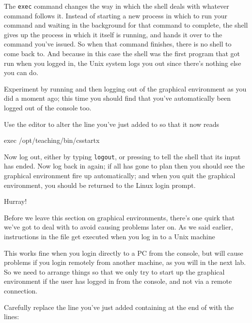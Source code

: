 The \texttt{exec} command changes the way in which the shell deals with whatever command follows it. Instead of starting a new process in which to run your command and waiting in the background for that command to complete, the shell gives up the process in which it itself is running, and hands it over to the command you've issued. So when that command finishes, there is no shell to come back to. And because in this case the shell was the first program that got run when you logged in, the Unix system logs you out since there's nothing else you can do.

Experiment by running  and then logging out of the graphical environment as you did a moment ago; this time you should find that you've automatically been logged out of the console too.

Use the  editor to alter the line you've just added to  so that it now reads

\begin{ttoutenv}
exec /opt/teaching/bin/csstartx
\end{ttoutenv}

Now log out, either by typing \texttt{logout},  or  pressing  to tell the shell that its input has ended. Now log back in again; if all has gone to plan then you should see the graphical environment fire up automatically; and when you quit the graphical environment, you should be returned to the Linux login prompt.

Hurray!

Before we leave this section on graphical environments, there's one quirk that we've got to deal with to avoid causing problems later on. As we said earlier, instructions in the  file get executed when you log in to a Unix machine

This works fine when you login directly to a PC from the console, but will cause problems if you login remotely from another machine, as you will in the next lab. So we need to arrange things so that we only try to start up the graphical environment if the user has logged in from the console, and not via a remote connection.

Carefully replace the line you've just added containing  at the end of  with the lines:


